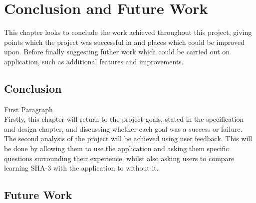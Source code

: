 \chapter{Conclusion and Future Work}
This chapter looks to conclude the work achieved throughout this project, giving points which the project was successful in and places which could be improved upon. Before finally suggesting futher work which could be carried out on application, such as additional features and improvements.
\section{Conclusion}
First Paragraph
\vspace{5mm}\\
Firstly, this chapter will return to the project goals, stated in the specification and design chapter, and discussing whether each goal was a success or failure. The second analysis of the project will be achieved using user feedback. This will be done by allowing them to use the application and asking them specific questions surrounding their experience, whilst also asking users to compare learning SHA-3 with the application to without it.

\section{Future Work}